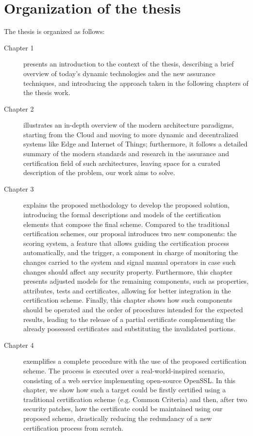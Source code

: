 \documentclass[a4paper, 12pt]{report}
\theoremstyle{definition}
\begin{document}
\section*{Organization of the thesis}
\label{organizzazione}
The thesis is organized as follows:
\begin{description}
    \item[Chapter 1] presents an introduction to the context of the thesis, describing a brief overview of today's dynamic technologies and the new assurance techniques, and introducing the approach taken in the following chapters of the thesis work.

    \item[Chapter 2] illustrates an in-depth overview of the modern architecture paradigms, starting from the Cloud and moving to more dynamic and decentralized systems like Edge and Internet of Things; furthermore, it follows a detailed summary of the modern standards and research in the assurance and certification field of such architectures, leaving space for a curated description of the problem, our work aims to solve.

    \item[Chapter 3] explains the proposed methodology to develop the proposed solution, introducing the formal descriptions and models of the certification elements that compose the final scheme. Compared to the traditional certification schemes, our proposal introduces two new components: the scoring system, a feature that allows guiding the certification process automatically, and the trigger, a component in charge of monitoring the changes carried to the system and signal manual operators in case such changes should affect any security property. Furthermore, this chapter presents adjusted models for the remaining components, such as properties, attributes, tests and certificates, allowing for better integration in the certification scheme. Finally, this chapter shows how such components should be operated and the order of procedures intended for the expected results, leading to the release of a partial certificate complementing the already possessed certificates and substituting the invalidated portions.

    \item[Chapter 4] exemplifies a complete procedure with the use of the proposed certification scheme. The process is executed over a real-world-inspired scenario, consisting of a web service implementing open-source OpenSSL. In this chapter, we show how such a target could be firstly certified using a traditional certification scheme (e.g. Common Criteria) and then, after two security patches, how the certificate could be maintained using our proposed scheme, drastically reducing the redundancy of a new certification process from scratch.


\end{description}
\end{document}
